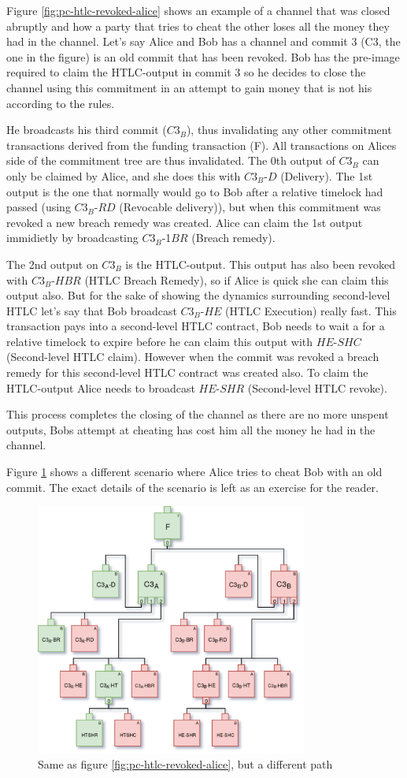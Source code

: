 Figure \ref{fig:pc-htlc-revoked-alice} shows an example of a channel that was closed abruptly and how a party that tries to cheat the other loses all the money they had in the channel. Let's say Alice and Bob has a channel and commit 3 (C3, the one in the figure) is an old commit that has been revoked. Bob has the pre-image required to claim the HTLC-output in commit 3 so he decides to close the channel using this commitment in an attempt to gain money that is not his according to the rules. 

He broadcasts his third commit ($C3_{B}$), thus invalidating any other commitment transactions derived from the funding transaction (F). All transactions on Alices side of the commitment tree are thus invalidated. The 0th output of $C3_{B}$ can only be claimed by Alice, and she does this with $C3_B$-$D$ (Delivery). The 1st output is the one that normally would go to Bob after a relative timelock had passed (using $C3_B$-$RD$ (Revocable delivery)), but when this commitment was revoked a new breach remedy was created. Alice can claim the 1st output immidietly by broadcasting $C3_B$-1$BR$ (Breach remedy).

The 2nd output on $C3_{B}$ is the HTLC-output. This output has also been revoked with $C3_B$-$HBR$ (HTLC Breach Remedy), so if Alice is quick she can claim this output also. But for the sake of showing the dynamics surrounding second-level HTLC let's say that Bob broadcast $C3_B$-$HE$ (HTLC Execution) really fast. This transaction pays into a second-level HTLC contract, Bob needs to wait a for a relative timelock to expire before he can claim this output with $HE$-$SHC$ (Second-level HTLC claim). However when the commit was revoked a breach remedy for this second-level HTLC contract was created also. To claim the HTLC-output Alice needs to broadcast $HE$-$SHR$ (Second-level HTLC revoke).

This process completes the closing of the channel as there are no more unspent outputs, Bobs attempt at cheating has cost him all the money he had in the channel. 

Figure \ref{fig:pc-htlc-revoked-bob} shows a different scenario where Alice tries to cheat Bob with an old commit. The exact details of the scenario is left as an exercise for the reader.

\begin{figure}[H]
	\centering
	\includegraphics[width=0.80\textwidth]{background/images/payment_channel_htlc_revoked_bob.png}
	\caption{Same as figure \ref{fig:pc-htlc-revoked-alice}, but a different path}
	\label{fig:pc-htlc-revoked-bob}
\end{figure}
